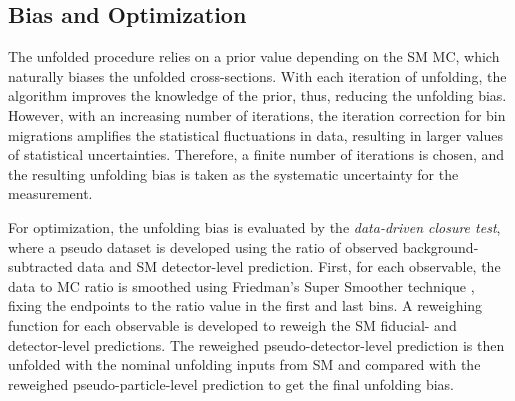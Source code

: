 \subsection{Bias and Optimization}
\label{subsec:Bias}

The unfolded procedure relies on a prior value depending on the SM MC, which naturally biases the unfolded cross-sections. With each iteration of unfolding, the algorithm improves the knowledge of the prior, thus, reducing the unfolding bias. However, with an increasing number of iterations, the iteration correction for bin migrations amplifies the statistical fluctuations in data, resulting in larger values of statistical uncertainties. Therefore, a finite number of iterations is chosen, and the resulting unfolding bias is taken as the systematic uncertainty for the measurement. 

For optimization, the unfolding bias is evaluated by the \textit{data-driven closure test}, where a pseudo dataset is developed using the ratio of observed background-subtracted data and SM detector-level prediction. First, for each observable, the data to MC ratio is smoothed using Friedman's Super Smoother technique \cite{FriedmanSmoother}, fixing the endpoints to the ratio value in the first and last bins. A reweighing function for each observable is developed to reweigh the SM fiducial- and detector-level predictions. The reweighed pseudo-detector-level prediction is then unfolded with the nominal unfolding inputs from SM and compared with the reweighed pseudo-particle-level prediction to get the final unfolding bias.

